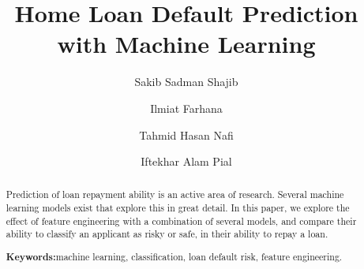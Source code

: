 \documentclass[sigconf, nonacm]{acmart}
\begin{document}
\title{Home Loan Default Prediction with Machine Learning}

\author{Sakib Sadman Shajib}

\author{Ilmiat Farhana}

\author{Tahmid Hasan Nafi}

\author{Iftekhar Alam Pial}

\begin{abstract}
Prediction of loan repayment ability is an active area of research. Several machine learning models exist that explore this in great detail. In this paper, we explore the effect of feature engineering with a combination of several models, and compare their ability to classify an applicant as risky or safe, in their ability to repay a loan.

{\bf Keywords:}machine learning, classification, loan default risk, feature engineering.

\end{abstract}

\maketitle

\end{document}
